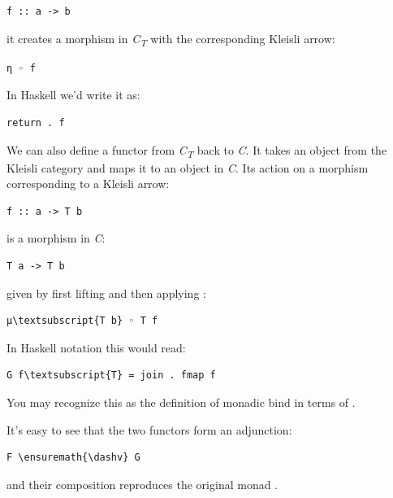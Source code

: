 \begin{Verbatim}[commandchars=\\\{\}]
f :: a -> b
\end{Verbatim}
it creates a morphism in \emph{C\textsubscript{T}} with the
corresponding Kleisli arrow:

\begin{Verbatim}[commandchars=\\\{\}]
η ◦ f
\end{Verbatim}
In Haskell we'd write it as:

\begin{Verbatim}[commandchars=\\\{\}]
return . f
\end{Verbatim}
We can also define a functor  from \emph{C\textsubscript{T}}
back to \emph{C}. It takes an object  from the Kleisli
category and maps it to an object  in \emph{C}. Its action
on a morphism  corresponding to a Kleisli arrow:

\begin{Verbatim}[commandchars=\\\{\}]
f :: a -> T b
\end{Verbatim}
is a morphism in \emph{C}:

\begin{Verbatim}[commandchars=\\\{\}]
T a -> T b
\end{Verbatim}
given by first lifting  and then applying :

\begin{Verbatim}[commandchars=\\\{\}]
μ\textsubscript{T b} ◦ T f
\end{Verbatim}
In Haskell notation this would read:

\begin{Verbatim}[commandchars=\\\{\}]
G f\textsubscript{T} = join . fmap f
\end{Verbatim}
You may recognize this as the definition of monadic bind in terms of
.

It's easy to see that the two functors form an adjunction:

\begin{Verbatim}[commandchars=\\\{\}]
F \ensuremath{\dashv} G
\end{Verbatim}
and their composition  reproduces the original monad
.

